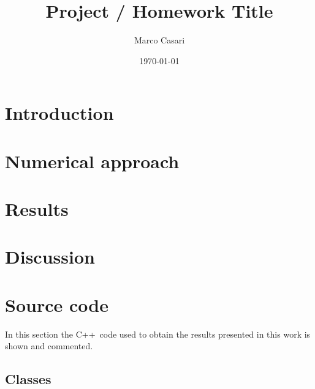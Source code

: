 \documentclass[a4paper,10pt,draft]{article}
\newcommand{\cpp}{C++}
\begin{document}
\title{Project / Homework Title} %
\author{Marco Casari}
\date{\today}
\maketitle

\begin{abstract}
\end{abstract}


\section{Introduction}

\section{Numerical approach} %

\section{Results}

\section{Discussion}

\newpage
\appendix

\section{Source code}
In this section the \cpp\ code used to obtain the results presented in this work is shown and commented.

\subsection{Classes}

\printbibliography[heading=bibintoc]
\end{document}
